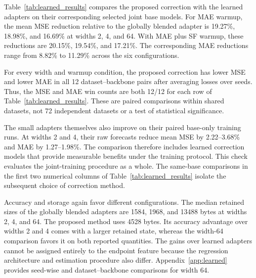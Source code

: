 \begin{table}[!tbp]
\caption{Comparisons on jointly trained base models. Positive percentages indicate error reductions, averaged over 12 dataset--backbone pairs after averaging the three seed losses. Proposed versus adapter uses the same joint base and global controller. Adapter versus base-only compares the raw joint adapter forecast against the paired base-only training run. Retained bytes are medians for the globally blended adapters; Proposed retains 4528 bytes in every row. SF denotes the additional spectral-flatness warmup term.}
\label{tab:learned_results}
\centering

\end{table}
Table~\ref{tab:learned_results} compares the proposed correction with the learned adapters on their corresponding selected joint base models. For MAE warmup, the mean MSE reduction relative to the globally blended adapter is 19.27\%, 18.98\%, and 16.69\% at widths 2, 4, and 64. With MAE plus SF warmup, these reductions are 20.15\%, 19.54\%, and 17.21\%. The corresponding MAE reductions range from 8.82\% to 11.29\% across the six configurations.

For every width and warmup condition, the proposed correction has lower MSE and lower MAE in all 12 dataset--backbone pairs after averaging losses over seeds. Thus, the MSE and MAE win counts are both 12/12 for each row of Table~\ref{tab:learned_results}. These are paired comparisons within shared datasets, not 72 independent datasets or a test of statistical significance.

The small adapters themselves also improve on their paired base-only training runs. At widths 2 and 4, their raw forecasts reduce mean MSE by 2.22--3.68\% and MAE by 1.27--1.98\%. The comparison therefore includes learned correction models that provide measurable benefits under the training protocol. This check evaluates the joint-training procedure as a whole. The same-base comparisons in the first two numerical columns of Table~\ref{tab:learned_results} isolate the subsequent choice of correction method.

Accuracy and storage again favor different configurations. The median retained sizes of the globally blended adapters are 1584, 1968, and 13488 bytes at widths 2, 4, and 64. The proposed method uses 4528 bytes. Its accuracy advantage over widths 2 and 4 comes with a larger retained state, whereas the width-64 comparison favors it on both reported quantities. The gains over learned adapters cannot be assigned entirely to the endpoint feature because the regression architecture and estimation procedure also differ. Appendix~\ref{app:learned} provides seed-wise and dataset--backbone comparisons for width 64.



